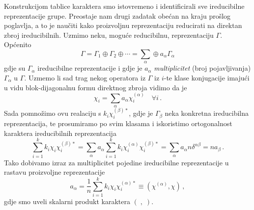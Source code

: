 Konstrukcijom tablice karaktera smo istovremeno i identificirali sve ireducibilne
reprezentacije grupe. Preostaje nam drugi zadatak obećan na kraju prošlog poglavlja,
a to je naučiti kako proizvoljnu reprezentaciju reducirati na direktan zbroj
ireducibilnih.  Uzmimo neku, moguće reducibilnu, reprezentaciju $\Gamma$. Općenito
\begin{displaymath}
  \Gamma = \Gamma_{1}\oplus\Gamma_{2}\oplus\cdots =
     \sum_{\alpha} \oplus a_{\alpha} \Gamma_{\alpha}
\end{displaymath}
gdje su $\Gamma_{\alpha}$ ireducibilne reprezentacije i
gdje je $a_{\alpha}$ \emph{multiplicitet} (broj pojavljivanja) 
$\Gamma_{\alpha}$ u $\Gamma$.
Uzmemo li sad trag nekog operatora iz $\Gamma$ iz  $i$-te klase konjugacije
imajući u vidu blok-dijagonalnu formu direktnog zbroja vidimo da je
\begin{equation}
  \chi_i = \sum_{\alpha}  a_{\alpha} \chi^{(\alpha)}_i \quad 
  \forall i  \,.
\end{equation}
Sada pomnožimo ovu realaciju s $k_i \chi^{(\beta)*}_i$, gdje je $\Gamma_{\beta}$
neka konkretna ireducibilna reprezentacija, te prosumiramo po svim klasama
i iskoristimo ortogonalnost karaktera ireducibilnih reprezentacija
\begin{equation}
\sum_{i=1}^{k} k_i \chi_i \chi^{(\beta)*}_i =
\sum_{\alpha}  a_{\alpha} \sum_{i=1}^{k} k_i\chi^{(\alpha)}_i \chi^{(\beta)*}_i
=\sum_{\alpha}  a_{\alpha} n \delta^{\alpha \beta} = n a_{\beta} \,.
\end{equation}
Tako dobivamo izraz za multiplicitet pojedine ireducibilne reprezentacije u
rastavu proizvoljne reprezentacije
\begin{equation}
a_{\alpha} = \frac{1}{n} \sum_{i=1}^{k}  k_i \chi_i \chi^{(\alpha)*}_i
\equiv (\chi^{(\alpha)}, \chi) \,,
\label{eq:multiplicitet}
\end{equation}
gdje smo uveli skalarni produkt karaktera $(\;,\;)$.


